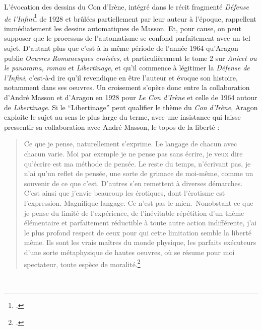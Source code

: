 L’évocation des dessins du Con d’Irène, intégré dans le récit fragmenté \emph{Défense de l’Infini}\footcite{defense} de 1928 et brûlées partiellement par leur auteur à l’époque, rappellent immédiatement les dessins automatiques de Masson. Et, pour cause, on peut supposer que le processus de l’automatisme se confond parfaitement avec un tel sujet. D’autant plus que c’est à la même période de l’année 1964 qu’Aragon publie \emph{Oeuvres Romanesques croisées}, et particulièrement le tome 2 sur \emph{Anicet ou le panorama, roman} et \emph{Libertinage}, et qu’il commence à légitimer la \emph{Défense de l’Infini}, c’est-à-d ire qu’il revendique en être l’auteur et évoque son histoire, notamment dans ses oeuvres. Un croisement s’opère donc entre la collaboration d’André Masson et d’Aragon en 1928 pour \emph{Le Con d’Irène} et celle de 1964 autour de \emph{Libertinage}. Si le  \enquote{Libertinage} peut qualifier le thème du \emph{Con d’Irène}, Aragon exploite le sujet au sens le plus large du terme, avec une insistance qui laisse pressentir sa collaboration avec André Masson, le topos de la liberté : 

\begin{quote}
Ce que je pense, naturellement s’exprime. Le langage de chacun avec chacun varie. Moi par exemple je ne pense pas sans écrire, je veux dire qu’écrire est ma méthode de pensée. Le reste du temps, n’écrivant pas, je n’ai qu’un reflet de pensée, une sorte de grimace de moi-même, comme un souvenir de ce que c’est. D’autres s’en remettent à diverses démarches. C’est ainsi que j’envie beaucoup les érotiques, dont l’érotisme est l’expression. Magnifique langage. Ce n’est pas le mien. Nonobstant ce que je pense du limité de l’expérience, de l’inévitable répétition d’un thème élémentaire et parfaitement réductible à toute autre action indifférente, j’ai le plus profond respect de ceux pour qui cette limitation semble la liberté même. Ils sont les vrais maîtres du monde physique, les parfaits exécuteurs d’une sorte métaphysique de hautes oeuvres, où se résume pour moi spectateur, toute espèce de moralité.\footcite[p266]{defense}	
\end{quote}
 


